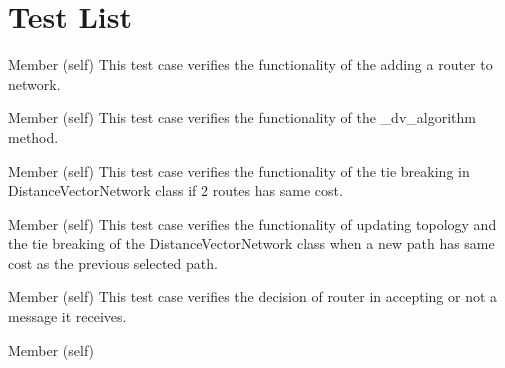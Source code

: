\chapter{Test List}
\hypertarget{test}{}\label{test}

\begin{DoxyRefList}
\item[Member \doxylink{classtest__dvr_1_1_test_distance_vector_network_ac063b0552c86373776006054b428f2c0}{test\+\_\+dvr.Test\+Distance\+Vector\+Network.test\+\_\+add\+\_\+router} (self)]\label{test__test000003}%
%
This test case verifies the functionality of the adding a router to network.  
\item[Member \doxylink{classtest__dvr_1_1_test_distance_vector_network_a9bc9c11716a1f59c7487e116ad134d07}{test\+\_\+dvr.Test\+Distance\+Vector\+Network.test\+\_\+dv\+\_\+algorithm} (self)]\label{test__test000004}%
%
This test case verifies the functionality of the \+\_\+dv\+\_\+algorithm method.  
\item[Member \doxylink{classtest__dvr_1_1_test_distance_vector_network_a52a2a293b1f425a7e33ac7174bfef9d9}{test\+\_\+dvr.Test\+Distance\+Vector\+Network.test\+\_\+tie\+\_\+break} (self)]\label{test__test000005}%
%
This test case verifies the functionality of the tie breaking in Distance\+Vector\+Network class if 2 routes has same cost.  
\item[Member \doxylink{classtest__dvr_1_1_test_distance_vector_network_a90fe4d64c95d2944792f0965d77ea02b}{test\+\_\+dvr.Test\+Distance\+Vector\+Network.test\+\_\+tie\+\_\+break\+\_\+after\+\_\+change} (self)]\label{test__test000006}%
%
This test case verifies the functionality of updating topology and the tie breaking of the Distance\+Vector\+Network class when a new path has same cost as the previous selected path.  
\item[Member \doxylink{classtest__dvr_1_1_test_distance_vector_router_af0bbb563504d7504bf9af54594f4571a}{test\+\_\+dvr.Test\+Distance\+Vector\+Router.test\+\_\+should\+\_\+accept\+\_\+message} (self)]\label{test__test000002}%
%
This test case verifies the decision of router in accepting or not a message it receives.  
\item[Member \doxylink{classtest__dvr_1_1_test_distance_vector_router_ad7af008506b99eedc9997308222921b8}{test\+\_\+dvr.Test\+Distance\+Vector\+Router.test\+\_\+update\+\_\+routing\+\_\+table} (self)]\label{test__test000001}%

\end{DoxyRefList}
